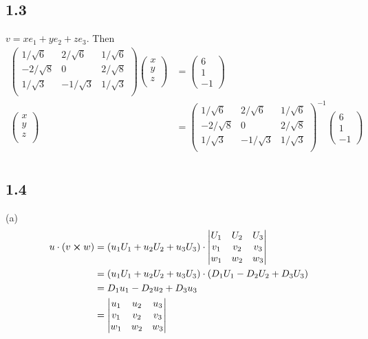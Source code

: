 \documentclass[12pt]{article}
\begin{document}
\subsection*{1.3}
 $v = xe_1 + y e_2 + ze_3$. Then
 $$
 \begin{aligned}
 	\begin{pmatrix}
 		1/\sqrt{6} &  2/\sqrt{6} &  1/\sqrt{6} \\
 		-2/\sqrt{8} &  0 &  2/\sqrt{8} \\
 		1/\sqrt{3} &  -1/\sqrt{3} &  1/\sqrt{3} \\
 	\end{pmatrix}
 	\begin{pmatrix}
 		x \\ y \\ z\\
 	\end{pmatrix}
 	&=
 	\begin{pmatrix}
 		6 \\ 1 \\ -1
 	\end{pmatrix} \\
 \begin{pmatrix}
 	x \\ y \\ z\\
 \end{pmatrix}
&=
 \begin{pmatrix}
 	1/\sqrt{6} &  2/\sqrt{6} &  1/\sqrt{6} \\
 	-2/\sqrt{8} &  0 &  2/\sqrt{8} \\
 	1/\sqrt{3} &  -1/\sqrt{3} &  1/\sqrt{3} \\
 \end{pmatrix}^{-1}
\begin{pmatrix}
	6 \\ 1 \\ -1
\end{pmatrix} \\
 \end{aligned}
 $$

\subsection*{1.4}
(a)
$$\begin{aligned}
	u\cdot (v \cross w) &= (u_1 U_1 + u_2 U_2 + u_3 U_3) \cdot \begin{vmatrix}
		U_1 & U_2 & U_3 \\
		v_1 & v_2 & v_3 \\
		w_1 & w_2 & w_3 \\
	\end{vmatrix} \\
 &=  (u_1 U_1 + u_2 U_2 + u_3 U_3) \cdot (D_1U_1 - D_2 U_2 + D_3 U_3) \\
 &= D_1 u_1 - D_2 u_2 + D_3 u_3 \\
 &=  \begin{vmatrix}
 	u_1 & u_2 & u_3 \\
 	v_1 & v_2 & v_3 \\
 	w_1 & w_2 & w_3 \\
 \end{vmatrix}
\end{aligned}$$
\end{document}
